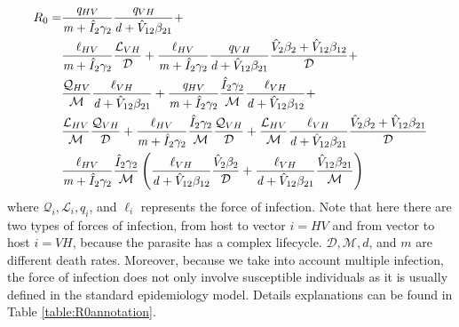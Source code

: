 \documentclass{article}
\begin{document}
\begin{subequations}
\begin{align}
R_0 = 
    & \frac{\mathit{q}_{HV}}{\mathit{m} + \hat{I}_2 \gamma_2} \frac{\mathit{q}_{VH}}{\mathit{d} + \hat{V}_{12} \beta_{21}} + \label{R0:singlyinfecthv} \\
    & \frac{\ell_{HV}}{\mathit{m} + \hat{I}_2 \gamma_2} \frac{\mathcal{L}_{VH}}{\mathcal{D}} + \frac{\ell_{HV}}{\mathit{m} + \hat{I}_2 \gamma_2} \frac{\mathit{q}_{VH}}{\mathit{d} + \hat{V}_{12} \beta_{21}} \frac{\hat{V}_2 \beta_2 + \hat{V}_{12} \beta_{12}}{\mathcal{D}} + \label{R0:singlyinfectv} \\
    & \frac{\mathcal{Q}_{HV}}{\mathcal{M}} \frac{\ell_{VH}}{\mathit{d} + \hat{V}_{12} \beta_{21}} + \frac{\mathit{q}_{HV}}{\mathit{m} + \hat{I}_2 \gamma_2} \frac{\hat{I}_2 \gamma_2}{\mathcal{M}} \frac{\ell_{VH}}{\mathit{d} + \hat{V}_{12} \beta_{12}} + \label{R0:singlyinfecth} \\
    & \frac{\mathcal{L}_{HV}}{\mathcal{M}} \frac{\mathcal{Q}_{VH}}{\mathcal{D}} + \frac{\ell_{HV}}{\mathit{m} + \hat{I}_2 \gamma_2} \frac{\hat{I}_2 \gamma_2}{\mathcal{M}} \frac{\mathcal{Q}_{VH}}{\mathcal{D}} + \frac{\mathcal{L}_{HV}}{\mathcal{M}} \frac{\ell_{VH}}{\mathit{d} + \hat{V}_{12} \beta_{21}} \frac{\hat{V}_2 \beta_2 + \hat{V}_{12} \beta_{21}}{\mathcal{D}} \label{R0:doublyinfect} \\
    & \frac{\ell_{HV}}{\mathit{m} + \hat{I}_2 \gamma_2} \frac{\hat{I}_2 \gamma_2}{\mathcal{M}} \left( \frac{\ell_{VH}}{\mathit{d} + \hat{V}_{12} \beta_{12}} \frac{\hat{V}_2 \beta_2}{\mathcal{D}} + \frac{\ell_{VH}}{\mathit{d} + \hat{V}_{12} \beta_{21}} \frac{\hat{V}_{12} \beta_{21}}{\mathcal{M}} \right) \notag
\end{align}
\end{subequations}
where $\mathcal{Q}_i, \mathcal{L}_i, \mathit{q}_i$, and $\ell_i$ represents the force of infection. Note that here there are two types of forces of infection, from host to vector $i = HV$ and from vector to host $i = VH$, because the parasite has a complex lifecycle. $\mathcal{D}, \mathcal{M}, \mathit{d}$, and $\mathit{m}$ are different death rates. Moreover, because we take into account multiple infection, the force of infection does not only involve susceptible individuals as it is usually defined in the standard epidemiology model. Details explanations can be found in Table \ref{table:R0annotation}. 
\end{document}
